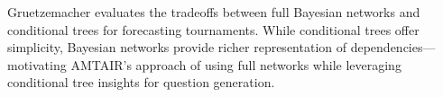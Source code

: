 \documentclass[
  11pt,
  letterpaper,
]{book}
\begin{document}
Gruetzemacher \textcite{gruetzemacher2022} evaluates the tradeoffs
between full Bayesian networks and conditional trees for forecasting
tournaments. While conditional trees offer simplicity, Bayesian networks
provide richer representation of dependencies---motivating AMTAIR's
approach of using full networks while leveraging conditional tree
insights for question generation.

\begin{figure}

\end{figure}
\end{document}
